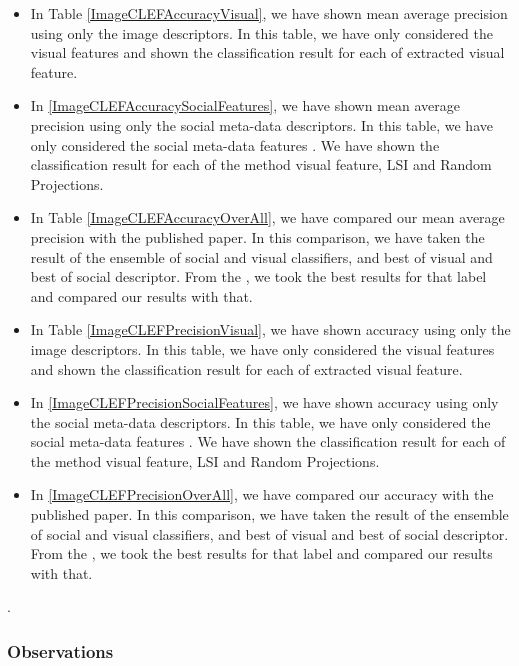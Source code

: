 \begin{itemize}
\item In Table \ref{ImageCLEFAccuracyVisual}, we have shown mean average precision using only the image descriptors. In this table, we have only considered the visual features and shown the classification result for each of extracted visual feature.
\item In \ref{ImageCLEFAccuracySocialFeatures}, we have shown mean average precision using only the social meta-data descriptors. In this table, we have only considered the social meta-data features . We have shown the classification result for each of the method visual feature, LSI and Random Projections.
\item In Table \ref{ImageCLEFAccuracyOverAll}, we have compared our mean average precision with the published paper. In this comparison, we have taken the result of the ensemble of social and visual classifiers, and best of visual and best of social descriptor.
From the  \citet*{CLEF}, we took the best results for that label and compared our results with that.
\item In Table \ref{ImageCLEFPrecisionVisual}, we have shown accuracy using only the image descriptors. In this table, we have only considered the visual features and shown the classification result for each of extracted visual feature.
\item In \ref{ImageCLEFPrecisionSocialFeatures}, we have shown accuracy using only the social meta-data descriptors. In this table, we have only considered the social meta-data features . We have shown the classification result for each of the method visual feature, LSI and Random Projections.
\item In \ref{ImageCLEFPrecisionOverAll}, we have compared our accuracy with the published paper. In this comparison, we have taken the result of the ensemble of social and visual classifiers, and best of visual and best of social descriptor. From the  \citet*{CLEF}, we took the best results for that label and compared our results with that.
\end{itemize}
. 
 
\subsubsection*{Observations}

